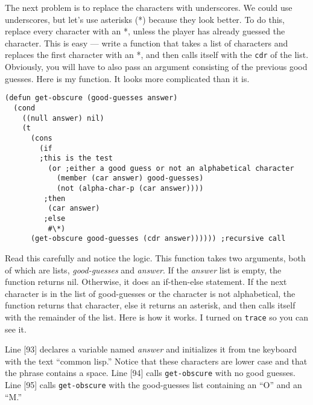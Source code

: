 \documentclass{article}
\begin{document}
The next problem is to replace the characters with underscores. We could use underscores, but let's use asterisks (*) because they look better. To do this, replace every character with an *, unless the player has already guessed the character. This is easy --- write a function that takes a list of characters and replaces the first character with an *, and then calls itself with the \texttt{cdr} of the list. Obviously, you will have to also pass an argument consisting of the previous good guesses. Here is my function. It looks more complicated than it is.

\begin{lstlisting}
(defun get-obscure (good-guesses answer)
  (cond
    ((null answer) nil)
    (t 
      (cons 
        (if 
        ;this is the test
          (or ;either a good guess or not an alphabetical character
            (member (car answer) good-guesses) 
            (not (alpha-char-p (car answer))))
         ;then   
          (car answer)
         ;else 
          #\*)
      (get-obscure good-guesses (cdr answer)))))) ;recursive call  
\end{lstlisting}

Read this carefully and notice the logic. This function takes two arguments, both of which are lists, \textit{good-guesses} and \textit{answer}. If the \textit{answer} list is empty, the function returns nil. Otherwise, it does an if-then-else statement. If the next character is in the list of good-guesses or the character is not alphabetical, the function returns that character, else it returns an asterisk, and then calls itself with the remainder of the list. Here is how it works. I turned on \texttt{trace} so you can see it.

Line [93] declares a variable named \textit{answer} and initializes it from tne keyboard with the text ``common lisp.'' Notice that these characters are lower case and that the phrase contains a space. Line [94] calls \texttt{get-obscure} with no good guesses. Line [95] calls \texttt{get-obscure} with the good-guesses list containing an ``O'' and an ``M.''
\end{document}
